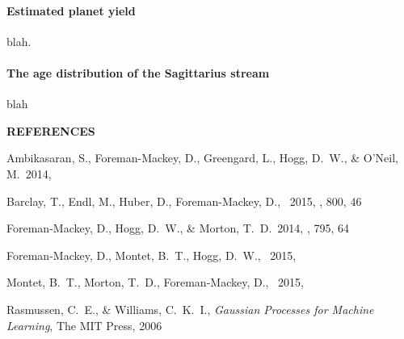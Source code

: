 \documentclass[letterpaper,12pt,preprint]{hack_aastex}
\begin{document}
\paragraph{Estimated planet yield} blah.

\paragraph{The age distribution of the Sagittarius stream}

blah



\begin{multicols}{2}
{\centering\bf REFERENCES\par}
\vspace{0.2em}
\begin{thebibliography}{}%
\raggedright\raggedbottom\scriptsize\setlength{\parskip}{-0.5em}%

Ambikasaran, S., Foreman-Mackey, D., Greengard, L., Hogg, D.~W.,
\& O'Neil, M.\ 2014, 

Barclay, T., Endl, M., Huber, D., Foreman-Mackey, D., \etal\ 2015, \apj, 800,
46

Foreman-Mackey, D., Hogg, D.~W., \& Morton, T.~D.\ 2014, \apj, 795, 64

Foreman-Mackey, D., Montet, B.~T., Hogg, D.~W., \etal\ 2015, 

Montet, B.~T., Morton, T.~D., Foreman-Mackey, D., \etal\ 2015,

Rasmussen, C.~E., \& Williams, C.~K.~I., \emph{Gaussian Processes for Machine
Learning}, The MIT Press, 2006

\end{thebibliography}
\end{multicols}
\end{document}
